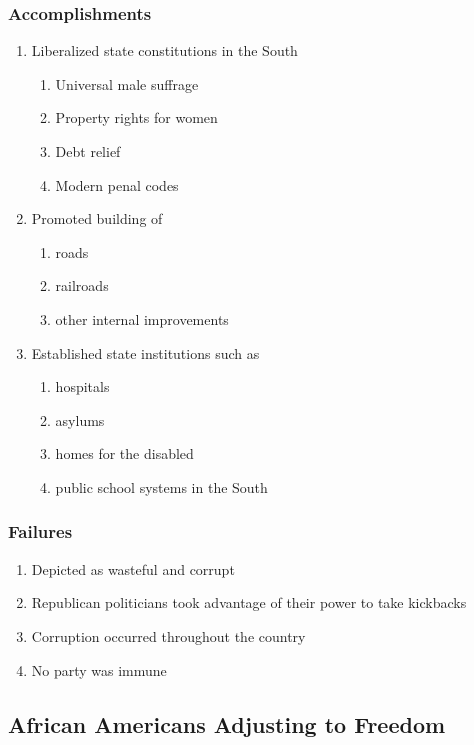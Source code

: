 \documentclass[12pt]{article} %
\begin{document}
\subsubsection{Accomplishments}
\begin{enumerate}
	\item Liberalized state constitutions in the South
	\begin{enumerate}
		\item Universal male suffrage
		\item Property rights for women
		\item Debt relief
		\item Modern penal codes
	\end{enumerate}
	\item Promoted building of
	\begin{enumerate}
		\item roads
		\item railroads
		\item other internal improvements
	\end{enumerate}
	\item Established state institutions such as
	\begin{enumerate}
		\item hospitals
		\item asylums
		\item homes for the disabled
		\item public school systems in the South
	\end{enumerate}
\end{enumerate}
\subsubsection{Failures}
\begin{enumerate}
	\item Depicted as wasteful and corrupt
	\item Republican politicians took advantage of their power to take kickbacks
	\item Corruption occurred throughout the country
	\item No party was immune
\end{enumerate}

\subsection{African Americans Adjusting to Freedom}
\end{document}
